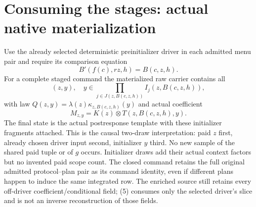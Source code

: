 \documentclass[11pt]{article}
\begin{document}
\section{Consuming the stages: actual native materialization}
Use the already selected deterministic preinitializer driver in each admitted menu pair and require its comparison equation
\[
              B'(f(c),r z,h)=B(c,z,h).                 \tag{4}
\]
For a complete staged command the materialized raw carrier contains all
\[
          (z,y),\quad y\in\prod_{j\in J(z,B(c,z,h))}I_j(z,B(c,z,h)),
\]
with law $Q(z,y)=\lambda(z)\kappa_{z,B(c,z,h)}(y)$ and actual coefficient
\[
                   M_{z,y}=K(z)\otimes T(z,B(c,z,h),y). \tag{5}
\]
The final state is the actual postresponse template with these initializer fragments attached. This is the causal two-draw interpretation: paid $z$ first, already chosen driver input second, initializer $y$ third. No new sample of the shared paid tuple or of $g$ occurs. Initializer draws add their actual context factors but no invented paid scope count. The closed command retains the full original admitted protocol--plan pair as its command identity, even if different plans happen to induce the same integrated row. The enriched source still retains every off-driver coefficient/conditional field; (5) consumes only the selected driver's slice and is not an inverse reconstruction of those fields.
\end{document}
